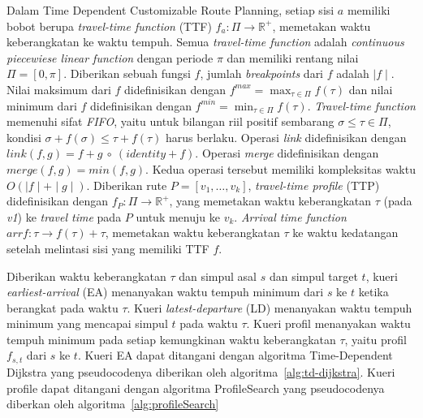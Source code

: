 Dalam Time Dependent Customizable Route Planning, setiap sisi $a$ memiliki bobot berupa \textit{travel-time function} (TTF) $f_a:\Pi\rightarrow \mathbb{R}^{+}$, memetakan waktu keberangkatan ke waktu tempuh. Semua \textit{travel-time function} adalah \textit{continuous piecewiese linear function} dengan periode $\pi$ dan memiliki rentang nilai $\Pi=[0,\pi]$. Diberikan sebuah fungsi $f$, jumlah \textit{breakpoints} dari $f$ adalah $\mid f\mid $. Nilai maksimum dari $f$ didefinisikan dengan $f^{max}=\max_{\tau\in\Pi}f(\tau)$ dan nilai minimum dari $f$ didefinisikan dengan $f^{min}=\min_{\tau\in\Pi}f(\tau)$. \textit{Travel-time function} memenuhi sifat \textit{FIFO}, yaitu untuk bilangan riil positif sembarang $\sigma\leq\tau\in\Pi$, kondisi $\sigma+f(\sigma)\leq \tau+f(\tau)$ harus berlaku. Operasi \textit{link} didefinisikan dengan $link(f,g)=f+g \ \circ \ (identity+f)$. Operasi \textit{merge} didefinisikan dengan $merge(f,g)=min(f,g)$. Kedua operasi tersebut memiliki kompleksitas waktu $O(\mid f\mid +\mid g\mid )$. Diberikan rute $P=[v_1,\ldots,v_k]$, \textit{travel-time profile} (TTP) didefinisikan dengan $f_P:\Pi\rightarrow \mathbb{R}^{+}$, yang memetakan waktu keberangkatan $\tau$ (pada \textit{v1}) ke \textit{travel time} pada $P$ untuk menuju ke $v_k$. \textit{Arrival time function} $arr f:\tau\rightarrow f(\tau)+\tau$, memetakan waktu keberangkatan $\tau$ ke waktu kedatangan setelah melintasi sisi yang memiliki TTF $f$. 

Diberikan waktu keberangkatan $\tau$ dan simpul asal $s$ dan simpul target $t$, kueri \textit{earliest-arrival} (EA) menanyakan waktu tempuh minimum dari $s$ ke $t$ ketika berangkat pada waktu $\tau$. Kueri \textit{latest-departure} (LD) menanyakan waktu tempuh minimum yang mencapai simpul $t$ pada waktu $\tau$. Kueri profil menanyakan waktu tempuh minimum pada setiap kemungkinan waktu keberangkatan $\tau$, yaitu profil $f_{s,t}$ dari $s$ ke $t$. Kueri EA dapat ditangani dengan algoritma Time-Dependent Dijkstra yang pseudocodenya diberikan oleh algoritma~\ref{alg:td-dijkstra}. Kueri profile dapat ditangani dengan algoritma ProfileSearch yang pseudocodenya diberkan oleh algoritma~\ref{alg:profileSearch}

